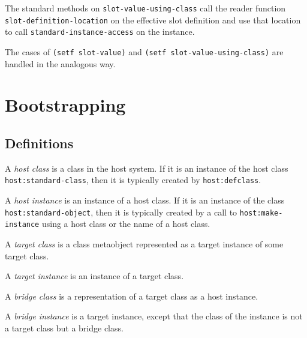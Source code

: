 The standard methods on \texttt{slot-value-using-class} call the
reader function \texttt{slot-definition-location} on the effective
slot definition and use that location to call
\texttt{standard-instance-access} on the instance.

The cases of \texttt{(setf slot-value)} and \texttt{(setf
  slot-value-using-class)} are handled in the analogous way.

\section{Bootstrapping}

\subsection{Definitions}

\begin{definition}
A \emph{host class} is a class in the host system.  If it is an
instance of the host class \texttt{host:standard-class}, then it is
typically created by \texttt{host:defclass}.
\end{definition}

\begin{definition}
A \emph{host instance} is an instance of a host class.  If it is an
instance of the class \texttt{host:standard-object}, then it is
typically created by a call to \texttt{host:make-instance} using a
host class or the name of a host class.
\end{definition}

\begin{definition}
A \emph{target class} is a class metaobject represented as a target
instance of some target class. 
\end{definition}

\begin{definition}
A \emph{target instance} is an instance of a target class.
\end{definition}

\begin{definition}
A \emph{bridge class} is a representation of a target class as a host
instance.
\end{definition}

\begin{definition}
A \emph{bridge instance} is a target instance, except that the class of
the instance is not a target class but a bridge class.
\end{definition}

